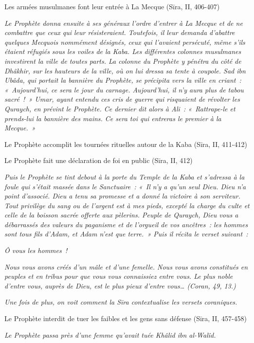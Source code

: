 Les armées musulmanes font leur entrée à La Mecque (Sīra, II, 406-407)

\emph{Le Prophète donna ensuite à ses généraux l'ordre d'entrer à La
Mecque et de ne combattre que ceux qui leur résisteraient. Toutefois, il
leur demanda d'abattre quelques Mecquois nommément désignés, ceux qui
l'avaient persécuté, même s'ils étaient réfugiés sous les voiles de la
Kaba. Les différentes colonnes musulmanes investirent la ville de
toutes parts. La colonne du Prophète y pénétra du côté de Dhâkhir, sur
les hauteurs de la ville, où on lui dressa sa tente à coupole. Sad
ibn Ubâda, qui portait la bannière du Prophète, se précipita vers
la ville en criant~: «~Aujourd'hui, ce sera le jour du carnage.
Aujourd'hui, il n'y aura plus de tabou sacré~!~» Umar, ayant
entendu ces cris de guerre qui risquaient de révolter les Quraych, en
prévint le Prophète. Ce dernier dit alors à Ali~: «~Rattrape-le et
prends-lui la bannière des mains. Ce sera toi qui entreras le premier à
la Mecque.~»}

Le Prophète accomplit les tournées rituelles autour de la Kaba
(Sīra, II, 411-412)

Le Prophète fait une déclaration de foi en public (Sīra, II, 412)

\emph{Puis le Prophète se tint debout à la porte du Temple de la
Kaba et s'adressa à la foule qui s'était massée dans le
Sanctuaire~: «~Il n'y a qu'un seul Dieu. Dieu n'a point d'associé. Dieu
a tenu sa promesse et a donné la victoire à son serviteur. Tout
privilège du sang ou de l'argent est à mes pieds, excepté la charge du
culte et celle de la boisson sacrée offerte aux pèlerins. Peuple de
Quraych, Dieu vous a débarrassés des valeurs du paganisme et de
l'orgueil de vos ancêtres~: les hommes sont tous fils d'Adam, et Adam
n'est que terre.~» Puis il récita le verset suivant~:}

\emph{Ô vous les hommes~!}

\emph{Nous vous avons créés d'un mâle et d'une femelle. Nous vous avons
constitués en peuples et en tribus pour que vous vous connaissiez entre
vous. Le plus noble d'entre vous, auprès de Dieu, est le plus pieux
d'entre vous\ldots{} (Coran, 49, 13.)}

\emph{Une fois de plus, on voit comment la Sīra contextualise les
versets coraniques.}

Le Prophète interdit de tuer les faibles et les gens sans défense (Sīra,
II, 457-458)

\emph{Le Prophète passa près d'une femme qu'avait tuée Khâlid ibn
al-Walîd.}


